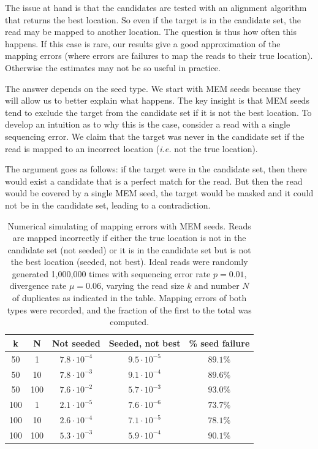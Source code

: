 \documentclass{article}
\begin{document}
The issue at hand is that the candidates are tested with an alignment
algorithm that returns the best location. So even if the target is in the
candidate set, the read may be mapped to another location. The question is
thus how often this happens. If this case is rare, our results give a good
approximation of the mapping errors (where errors are failures to map the
reads to their true location). Otherwise the estimates may not be so
useful in practice.

The answer depends on the seed type. We start with MEM seeds because they
will allow us to better explain what happens. The key insight is that MEM
seeds tend to exclude the target from the candidate set if it is not the
best location. To develop an intuition as to why this is the case,
consider a read with a single sequencing error. We claim that the target
was never in the candidate set if the read is mapped to an incorrect
location (\textit{i.e.} not the true location).

The argument goes as follows: if the target were in the candidate set,
then there would exist a candidate that is a perfect match for the read.
But then the read would be covered by a single MEM seed, the target would
be masked and it could not be in the candidate set, leading to a
contradiction.

\begin{table}
\renewcommand{\arraystretch}{1.1}
\centering
\begin{tabular}{ccccc}
k & N & Not seeded & Seeded, not best & \% seed failure \\
\hline
50  &  1  & $7.8 \cdot 10^{-4}$ & $9.5 \cdot 10^{-5}$ & $89.1\%$ \\
50  & 10  & $7.8 \cdot 10^{-3}$ & $9.1 \cdot 10^{-4}$ & $89.6\%$ \\
50  & 100 & $7.6 \cdot 10^{-2}$ & $5.7 \cdot 10^{-3}$ & $93.0\%$ \\
100 &  1  & $2.1 \cdot 10^{-5}$ & $7.6 \cdot 10^{-6}$ & $73.7\%$ \\
100 & 10  & $2.6 \cdot 10^{-4}$ & $7.1 \cdot 10^{-5}$ & $78.1\%$ \\
100 & 100 & $5.3 \cdot 10^{-3}$ & $5.9 \cdot 10^{-4}$ & $90.1\%$
\end{tabular}
\caption{Numerical simulating of mapping errors with MEM seeds. Reads are
mapped incorrectly if either the true location is not in the candidate set
(not seeded) or it is in the candidate set but is not the best location
(seeded, not best). Ideal reads were randomly generated 1,000,000 times
with sequencing error rate $p = 0.01$, divergence rate $\mu = 0.06$,
varying the read size $k$ and number $N$ of duplicates as indicated in the
table. Mapping errors of both types were recorded, and the fraction of the
first to the total was computed.}
\label{table_mem}
\end{table}
\end{document}
